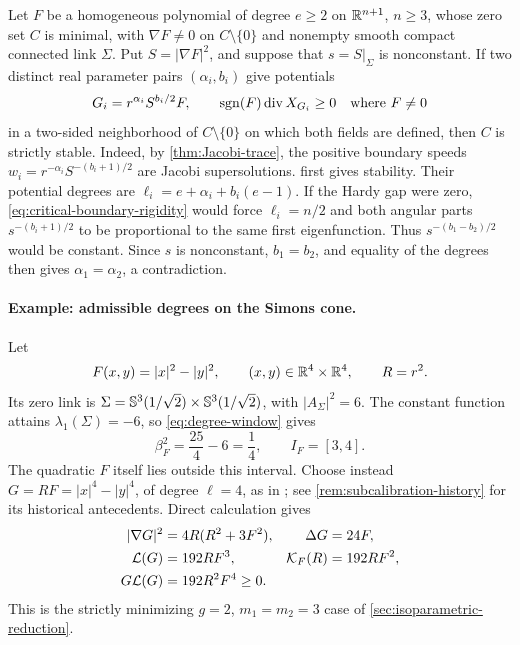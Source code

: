\begin{remark}
\label{cor:two-power-strict-stability}
Let $F$ be a homogeneous polynomial of degree $e\ge2$ on
$\mathbb R^{n+1}$, $n\ge3$, whose zero set $C$ is minimal, with
$\nabla F\ne0$ on $C\setminus\{0\}$ and nonempty smooth compact
connected link $\Sigma$. Put $S=|\nabla F|^2$, and suppose that
$s=S|_\Sigma$ is nonconstant. If two distinct real parameter pairs
$(\alpha_i,b_i)$ give potentials
\[
 G_i=r^{\alpha_i}S^{b_i/2}F,\qquad
 \operatorname{sgn}(F)\operatorname{div} X_{G_i}\ge0\quad\text{where }F\ne0
\]
in a two-sided neighborhood of $C\setminus\{0\}$ on which both
fields are defined, then $C$ is strictly stable.
Indeed, by \cref{thm:Jacobi-trace}, the positive boundary speeds
$w_i=r^{-\alpha_i}S^{-(b_i+1)/2}$ are Jacobi supersolutions.
 first gives stability.
Their potential degrees are $\ell_i=e+\alpha_i+b_i(e-1)$.
If the Hardy gap were zero, \eqref{eq:critical-boundary-rigidity}
would force $\ell_i=n/2$ and both angular parts
$s^{-(b_i+1)/2}$ to be proportional to the same first eigenfunction.
Thus $s^{-(b_1-b_2)/2}$ would be constant. Since $s$ is nonconstant,
$b_1=b_2$, and equality of the degrees then gives $\alpha_1=\alpha_2$,
a contradiction.
\end{remark}

\paragraph{Example: admissible degrees on the Simons cone.}
\label{par:Simons-degree-example}
Let
\[
 F(x,y)=|x|^2-|y|^2,\qquad (x,y)\in\mathbb R^4\times\mathbb R^4,\qquad R=r^2.
\]
Its zero link is
\(\Sigma=\mathbb S^3(1/\sqrt2)\times\mathbb S^3(1/\sqrt2)\), with
\(|A_\Sigma|^2=6\).  The constant function attains
\(\lambda_1(\Sigma)=-6\), so \eqref{eq:degree-window} gives
\[
 \beta_F^2=\frac{25}{4}-6=\frac14,\qquad I_F=[3,4].
\]
The quadratic \(F\) itself lies outside this interval.  Choose instead
\(G=RF=|x|^4-|y|^4\), of degree \(\ell=4\), as in
\cite[Section~2]{DePhilippisPaolini}; see
\cref{rem:subcalibration-history} for its historical antecedents.
Direct calculation gives
\begin{align*}
 |\nabla G|^2&=4R(R^2+3F^2),& \Delta G&=24F,\\
 \mathcal L(G)&=192RF^3,& \mathcal K_F(R)&=192RF^2,\\
 G\mathcal L(G)&=192R^2F^4\geq0.
\end{align*}
This is the strictly minimizing \(g=2\), \(m_1=m_2=3\) case of
\cref{sec:isoparametric-reduction}.

